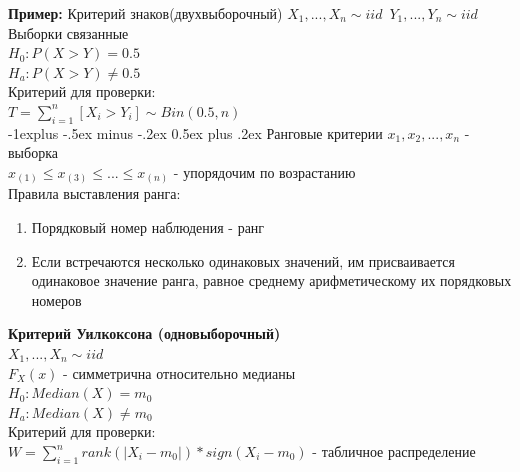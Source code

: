 \documentclass[10pt,landscape]{article}
\makeatletter
\renewcommand{\subsection}{\@startsection{subsection}{2}{0mm}%
                                {-1explus -.5ex minus -.2ex}%
                                {0.5ex plus .2ex}%
                                {\normalfont\normalsize\bfseries}}
\makeatother
\begin{document}
\begin{multicols}{3}
\textbf{Пример:} Критерий знаков(двухвыборочный)
$X_1, ..., X_n \sim iid$\
$Y_1, ..., Y_n \sim iid$\\
Выборки связанные\\
$H_0: P(X>Y) = 0.5$\\
$H_a: P(X>Y) \neq 0.5$\\
Критерий для проверки:\\
$T = \sum\limits_{i=1}^n[X_i > Y_i] \sim Bin(0.5, n)$\\
\newpage
\subsection{Ранговые критерии}
$x_1, x_2, ... , x_n$ - выборка \\
$x_{(1)} \leq x_{(3)} \leq ... \leq x_{(n)}$ - упорядочим по возрастанию\\

Правила выставления ранга:
\begin{enumerate}
    \item Порядковый номер наблюдения - ранг
    \item Если встречаются несколько одинаковых значений, им присваивается одинаковое значение ранга, равное среднему арифметическому их порядковых номеров
\end{enumerate}
\textbf{Критерий Уилкоксона (одновыборочный)}\\
$X_1, ... , X_n \sim iid$\\
$F_X(x)$ - симметрична относительно медианы\\
$H_0: Median(X) = m_0$\\
$H_a: Median(X) \neq m_0$\\
Критерий для проверки:\\
$W = \sum\limits_{i=1}^n rank(|X_i - m_0|) * sign(X_i-m_0)$ - табличное распределение\\


\end{multicols}
\end{document}
